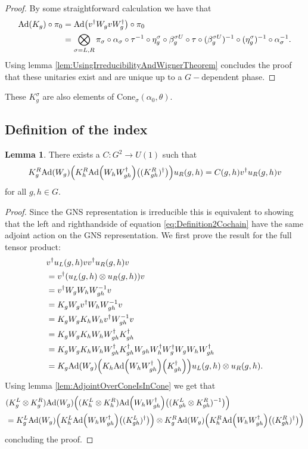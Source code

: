 \documentclass[12pt,a4paper,twoside]{article}
\let\originalleft\left
\let\originalright\right
\renewcommand{\left}{\mathopen{}\mathclose\bgroup\originalleft}
\renewcommand{\right}{\aftergroup\egroup\originalright}
\newcommand{\Ad}[1]{\textrm{Ad}\left(#1\right)}
\theoremstyle{definition}
\newtheorem{lemma}[theorem]{Lemma}
\numberwithin{equation}{section}
\begin{document}
\begin{proof}
	By some straightforward calculation we have that
	\begin{align}
		\Ad{K_g}\circ\pi_0&=\Ad{v^\dagger W_g v W_g^\dagger}\circ\pi_0\\
		&=\bigotimes_{\sigma=L,R}\pi_\sigma\circ\alpha_\sigma\circ\tau^{-1}\circ \eta_g^\sigma\circ\beta_g^{\sigma U}\circ\tau\circ(\beta_g^{\sigma U})^{-1}\circ(\eta_g^{\sigma})^{-1}\circ\alpha_\sigma^{-1}.
	\end{align}
	Using lemma \ref{lem:UsingIrreducibilityAndWignerTheorem} concludes the proof that these unitaries exist and are unique up to a $G-$dependent phase.
\end{proof}
These $K_g^\sigma$ are also elements of $\textrm{Cone}_\sigma(\alpha_0,\theta)$. 
\subsection{Definition of the index}
\begin{lemma}\label{lem:Definition2Cochain}
	There exists a $C:G^2\rightarrow U(1)$ such that 
	\begin{equation}\label{eq:Definition2Cochain}
		K_g^R\Ad{W_g}\left(K_h^R\Ad{W_hW_{gh}^\dagger}\left((K_{gh}^R)^\dagger\right)\right)u_
		R(g,h)=C(g,h)v^\dagger u_R(g,h)v
	\end{equation}
	for all $g,h\in G.$
\end{lemma}
\begin{proof}
	Since the GNS representation is irreducible this is equivalent to showing that the left and righthandside of equation \eqref{eq:Definition2Cochain} have the same adjoint action on the GNS representation. We first prove the result for the full tensor product:
	\begin{align}
		&v^\dagger u_L(g,h)v v^\dagger u_R(g,h) v\\
		&=v^\dagger (u_L(g,h)\otimes u_R(g,h)) v\\
		&=v^\dagger W_g W_h W_{gh}^{-1}v\\
		&=K_gW_g v^\dagger W_h W_{gh}^{-1}v\\
		&=K_gW_g K_h W_h v^\dagger W_{gh}^{-1}v\\
		&=K_gW_g K_h W_h W_{gh}^\dagger K_{gh}^\dagger\\
		&=K_gW_g K_h W_h W_{gh}^\dagger K_{gh}^\dagger W_{gh}W_h^\dagger W_g^\dagger W_gW_hW_{gh}^\dagger\\
		&=K_g\Ad{W_g}\left(K_h\Ad{W_hW_{gh}^\dagger}\left(K_{gh}^\dagger\right)\right)u_L(g,h)\otimes u_
			R(g,h).
	\end{align}
	Using lemma \ref{lem:AdjointOverConeIsInCone} we get that
	\begin{align}
		&(K_g^L\otimes K_g^R)\Ad{W_g}\left((K_h^L\otimes K_h^R)\Ad{W_hW_{gh}^\dagger}\left((K_{gh}^L\otimes K_{gh}^R)^{-1}\right)\right)\\
		&=K_g^L\Ad{W_g}\left(K_h^L\Ad{W_hW_{gh}^\dagger}\left((K_{gh}^L)^\dagger\right)\right)\otimes K_g^R\Ad{W_g}\left(K_h^R\Ad{W_hW_{gh}^\dagger}\left((K_{gh}^R)^\dagger\right)\right)
	\end{align}
	concluding the proof.
\end{proof}
\end{document}

